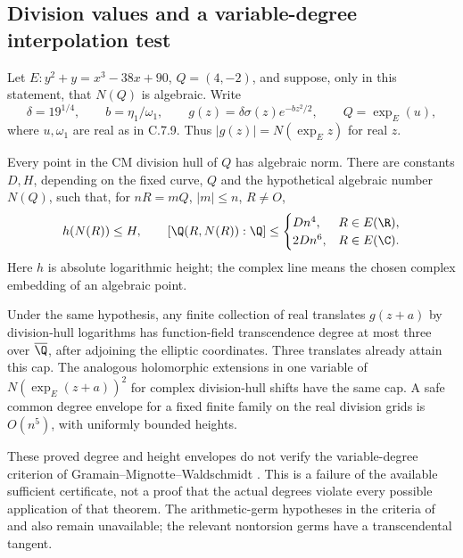 \subsection{Division values and a variable-degree interpolation test}

\begin{proposition}\label{ari:C.7.12}
Let $E:y^2+y=x^3-38x+90$, $Q=(4,-2)$, and suppose, only in
this statement, that $N(Q)$ is algebraic.  Write
\[
 \delta=19^{1/4},\qquad b=\eta_1/\omega_1,\qquad
 g(z)=\delta\sigma(z)e^{-bz^2/2},\qquad Q=\exp_E(u),
\]
where $u,\omega_1$ are real as in C.7.9.  Thus
$|g(z)|=N(\exp_E z)$ for real $z$.

Every point in the CM division hull of $Q$ has algebraic norm.
There are constants $D,H$, depending on the fixed curve, $Q$ and
the hypothetical algebraic number $N(Q)$, such that, for
$nR=mQ$, $|m|\leq n$, $R\ne O$,
\[
 h(N(R))\leq H,
 \qquad
 [\Q(R,N(R)):\Q]\leq
 \begin{cases}Dn^4,&R\in E(\R),\\2Dn^6,&R\in E(\C).
 \end{cases}
\]
Here $h$ is absolute logarithmic height; the complex line means
the chosen complex embedding of an algebraic point.

Under the same hypothesis, any finite collection of real translates
$g(z+a)$ by division-hull logarithms has function-field
transcendence degree at most three over $\overline\Q$, after
adjoining the elliptic coordinates.  Three translates already
attain this cap.  The analogous holomorphic extensions in one
variable of $N(\exp_E(z+a))^2$ for complex division-hull shifts
have the same cap.  A safe common degree envelope for a fixed
finite family on the real division grids is $O(n^5)$, with
uniformly bounded heights.

These proved degree and height envelopes do not verify the
variable-degree criterion of Gramain--Mignotte--Waldschmidt
\citep[Theorem 2.1]{gramain1986values}.  This is a failure of the
available sufficient certificate, not a proof that the actual
degrees violate every possible application of that theorem.
The arithmetic-germ hypotheses in the criteria of
\citet[Theorem 6.1]{herblot2012meromorphic} and
\citet[Theorem 4.16]{gasbarri2010analytic} also remain unavailable;
the relevant nontorsion germs have a transcendental tangent.
\end{proposition}

